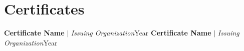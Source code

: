 \section{Certificates}
  \resumeSubHeadingListStart
    \resumeProjectHeading
      {\textbf{Certificate Name} $|$ \emph{Issuing Organization}}{Year}
    \resumeProjectHeading
      {\textbf{Certificate Name} $|$ \emph{Issuing Organization}}{Year}
  \resumeSubHeadingListEnd
